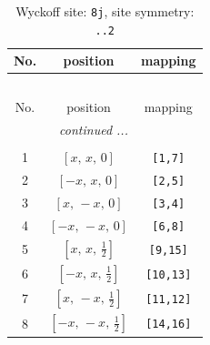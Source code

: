 \documentclass[fleqn,8pt]{jsarticle}
\begin{document}
\begin{longtable}{ccc}
\caption{Wyckoff site: {\tt 8j}, site symmetry: {\tt ..2}}
 \\
 \hline \hline
No. & position & mapping \\ \hline \endfirsthead

\multicolumn{2}{l}{\tablename\ \thetable{}} \\
 \hline \hline
No. & position & mapping \\ \hline \endhead

 \hline \hline
\multicolumn{2}{r}{\footnotesize\it continued ...} \\ \endfoot

 \hline \hline
\multicolumn{2}{r}{} \\ \endlastfoot

1 & $\left[ x,\, x,\, 0 \right]$ & {\tt [1,7]} \\ \hline
2 & $\left[ - x,\, x,\, 0 \right]$ & {\tt [2,5]} \\ \hline
3 & $\left[ x,\, - x,\, 0 \right]$ & {\tt [3,4]} \\ \hline
4 & $\left[ - x,\, - x,\, 0 \right]$ & {\tt [6,8]} \\ \hline
5 & $\left[ x,\, x,\, \frac{1}{2} \right]$ & {\tt [9,15]} \\ \hline
6 & $\left[ - x,\, x,\, \frac{1}{2} \right]$ & {\tt [10,13]} \\ \hline
7 & $\left[ x,\, - x,\, \frac{1}{2} \right]$ & {\tt [11,12]} \\ \hline
8 & $\left[ - x,\, - x,\, \frac{1}{2} \right]$ & {\tt [14,16]} \\
\end{longtable}
\renewcommand{\arraystretch}{1.2}
\end{document}
